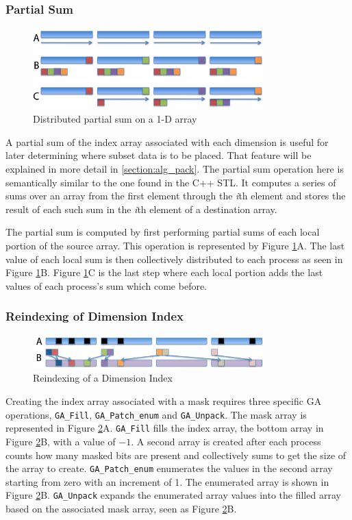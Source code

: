 \subsubsection{Partial Sum}

\begin{figure}[!t]
\center
\includegraphics[width=3.5in]{images/partialsum_label}
\caption{Distributed partial sum on a 1-D array}
\label{fig:partialsum}
\end{figure}

A partial sum of the index array associated with each dimension is useful for
later determining where subset data is to be placed.  That feature will be
explained in more detail in \ref{section:alg_pack}.  The partial sum operation
here is semantically similar to the one found in the C++ STL\cite{CXXSTL}.  It
computes a series of sums over an array from the first element through the
\emph{i}th element and stores the result of each such sum in the \emph{i}th
element of a destination array.

The partial sum is computed by first performing partial sums of each local
portion of the source array.  This operation is represented by Figure
\ref{fig:partialsum}A.  The last value of each local sum is then collectively
distributed to each process as seen in Figure \ref{fig:partialsum}B.  Figure
\ref{fig:partialsum}C is the last step where each local portion adds the last
values of each process's sum which come before.

\subsubsection{Reindexing of Dimension Index}

\begin{figure}[!t]
\center
\includegraphics[width=3.5in]{images/unpack_label}
\caption{Reindexing of a Dimension Index}
\label{fig:unpack}
\end{figure}

Creating the index array associated with a mask requires three specific GA
operations, \verb=GA_Fill=, \verb=GA_Patch_enum= and \verb=GA_Unpack=.  The
mask array is represented in Figure \ref{fig:unpack}A.  \verb=GA_Fill= fills
the index array, the bottom array in Figure \ref{fig:unpack}B,  with a value
of $-1$.  A second array is created after each process counts how many masked
bits are present and collectively sums to get the size of the array to create.
\verb=GA_Patch_enum= enumerates the values in the second array starting from
zero with an increment of 1.  The enumerated array is shown in Figure
\ref{fig:unpack}B.  \verb=GA_Unpack= expands the enumerated array values into
the filled array based on the associated mask array, seen as Figure
\ref{fig:unpack}B.

